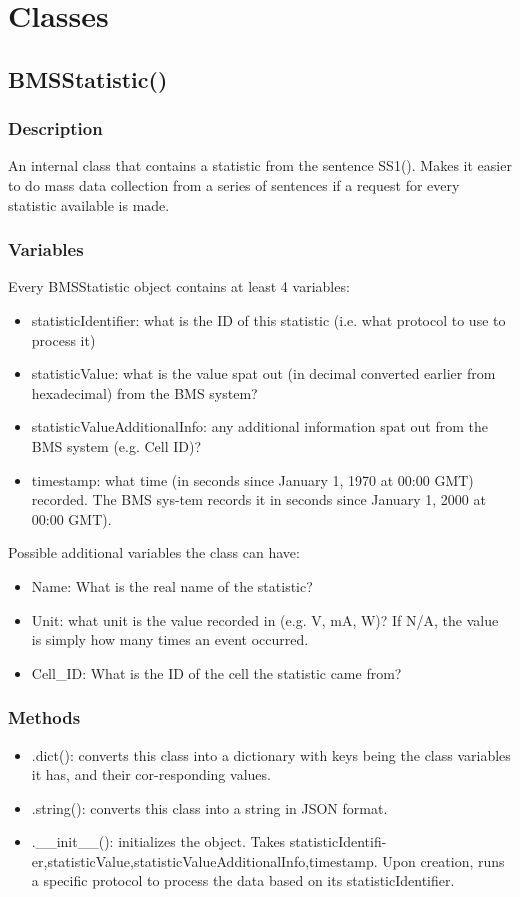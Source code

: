 \section{Classes}

\subsection{BMSStatistic()}
\subsubsection{Description}
An internal class that contains a statistic from the sentence SS1(). Makes it easier to do mass data collection from a series of sentences if a request for every statistic available is made.
\subsubsection{Variables}
Every BMSStatistic object contains at least 4 variables:
\begin{itemize}
	\item statisticIdentifier: what is the ID of this statistic (i.e. what protocol to use to process it)
	\item statisticValue: what is the value spat out (in decimal converted earlier from hexadecimal) from the BMS system?
	\item statisticValueAdditionalInfo: any additional information spat out from the BMS system (e.g. Cell ID)?
	\item timestamp: what time (in seconds since January 1, 1970 at 00:00 GMT) recorded. The BMS sys-tem records it in seconds since January 1, 2000 at 00:00 GMT).
\end{itemize}

Possible additional variables the class can have: 
\begin{itemize}
	\item Name: What is the real name of the statistic?
	\item Unit: what unit is the value recorded in (e.g. V, mA, W)? If N/A, the value is simply how many times an event occurred.
	\item Cell\_ID: What is the ID of the cell the statistic came from?
\end{itemize}

\subsubsection{Methods}
\begin{itemize}
	\item .dict(): converts this class into a dictionary with keys being the class variables it has, and their cor-responding values.
	\item .string(): converts this class into a string in JSON format. 
	\item .\_\_init\_\_(): initializes the object. Takes statisticIdentifi-er,statisticValue,statisticValueAdditionalInfo,timestamp. Upon creation, runs a specific protocol to process the data based on its statisticIdentifier.
\end{itemize}

